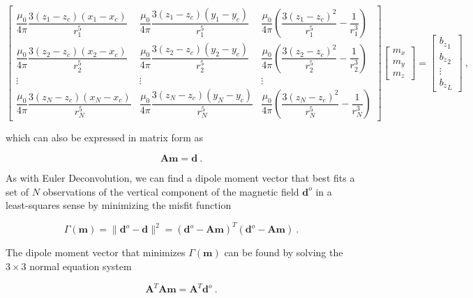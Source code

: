 \begin{equation}
\label{CgjOtKLQKT}
\begin{bmatrix}
\dfrac{\mu_0}{4\pi}\dfrac{3(z_1 - z_c)(x_1 - x_c)}{r_1^5}
& \dfrac{\mu_0}{4\pi}\dfrac{3(z_1 - z_c)(y_1 - y_c)}{r_1^5}
& \dfrac{\mu_0}{4\pi}\left(\dfrac{3(z_1 - z_c)^2}{r_1^5} - \dfrac{1}{r_1^3}\right)
\\
\dfrac{\mu_0}{4\pi}\dfrac{3(z_2 - z_c)(x_2 - x_c)}{r_2^5}
& \dfrac{\mu_0}{4\pi}\dfrac{3(z_2 - z_c)(y_2 - y_c)}{r_2^5}
& \dfrac{\mu_0}{4\pi}\left(\dfrac{3(z_2 - z_c)^2}{r_2^5} - \dfrac{1}{r_2^3}\right)
\\
\vdots & \vdots & \vdots
\\
\dfrac{\mu_0}{4\pi}\dfrac{3(z_N - z_c)(x_N - x_c)}{r_N^5}
& \dfrac{\mu_0}{4\pi}\dfrac{3(z_N - z_c)(y_N - y_c)}{r_N^5}
& \dfrac{\mu_0}{4\pi}\left(\dfrac{3(z_N - z_c)^2}{r_N^5} - \dfrac{1}{r_N^3}\right)
\end{bmatrix}
\begin{bmatrix}
m_x \\ m_y \\ m_z
\end{bmatrix}
=
\begin{bmatrix}
{b_z}_1 \\ {b_z}_2 \\ \vdots \\ {b_z}_L
\end{bmatrix}
\ ,
\end{equation}

\noindent
which can also be expressed in matrix form as

\begin{equation}
\label{qdhqM4s9Ln}
\mathbf{A} \mathbf{m} = \mathbf{d} \ .
\end{equation}

As with Euler Deconvolution, we can find a dipole moment vector that best fits
a set of $N$ observations of the vertical component of the magnetic field
$\mathbf{d}^o$ in a least-squares sense by minimizing the misfit function

\begin{equation}
\label{uV9pRVYO4l}
\Gamma (\mathbf{m}) = \| \mathbf{d}^o - \mathbf{d} \|^2 = (\mathbf{d}^o - \mathbf{A}\mathbf{m})^T  (\mathbf{d}^o - \mathbf{A}\mathbf{m})\ .
\end{equation}

\noindent
The dipole moment vector that minimizes $\Gamma (\mathbf{m})$ can be found by
solving the $3 \times 3$ normal equation system

\begin{equation}
\mathbf{A}^T \mathbf{A} \mathbf{m} = \mathbf{A}^T\mathbf{d}^o\ .
\end{equation}

